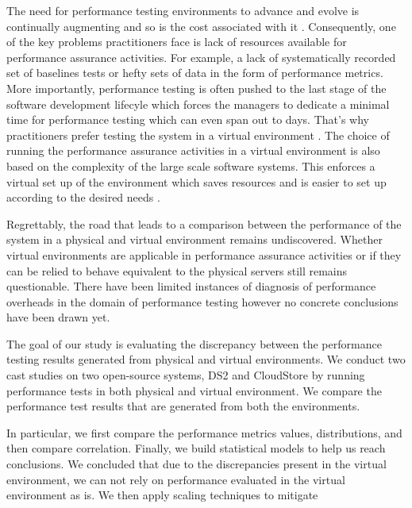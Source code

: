 The need for performance testing environments to advance and evolve is continually augmenting and so is the cost associated with it \cite{stpmag} \cite{bertolino2007software}. Consequently, one of the key problems practitioners face is lack of resources available for performance assurance activities\cite{5306331}. For example, a lack of systematically recorded set of baselines tests or hefty sets of data in the form of performance metrics. More importantly, performance testing is often pushed to the last stage of the software development lifecyle which forces the managers to dedicate a minimal time for performance testing which can even span out to days. That's why practitioners prefer testing the system in a virtual environment \cite{whyvirtualisbetter}\cite{vmwarehighcost}. The choice of running the performance assurance activities in a virtual environment is also based on the complexity of the large scale software systems. This enforces a virtual set up of the environment which saves resources and is easier to set up according to the desired needs \cite{VMWarePowerCLIBlog}\cite{seetharaman2006test}. 

Regrettably, the road that leads to a comparison between the performance of the system in a physical and virtual environment remains undiscovered. Whether virtual environments are applicable in performance assurance activities or if they can be relied to behave equivalent to the physical servers still remains questionable. There have been limited instances of diagnosis of performance overheads \cite{menon2005diagnosing} in the domain of performance testing however no concrete conclusions have been drawn yet. 

The goal of our study is evaluating the discrepancy between the performance testing results generated from physical and virtual environments. 
We conduct two cast studies on two open-source systems, DS2\cite{delldvd} and CloudStore \cite{cloudstore} by running performance tests in both physical and virtual environment. We compare the performance test results that are generated from both the environments.

In particular, we first compare the performance metrics values, distributions, and then compare correlation. Finally, we build statistical models to help us reach conclusions. We concluded that due to the discrepancies present in the virtual environment, we can not rely on performance evaluated in the virtual environment as is. We then apply scaling techniques to mitigate 


